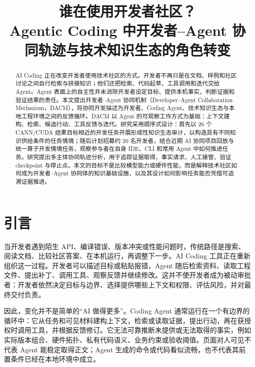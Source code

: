 \documentclass[manuscript,review,anonymous]{acmart}
\newcommand{\cn}[1]{#1}
\begin{document}
\title{\cn{谁在使用开发者社区？}\\Agentic Coding \cn{中开发者--Agent 协同轨迹与技术知识生态的角色转变}}

\begin{abstract}
AI Coding 正在改变开发者使用技术社区的方式。开发者不再只是在文档、样例和社区讨论之间自行检索与拼接知识；他们还把检索、代码起草、工具调用和迭代交给 Agent。Agent 表面上的自主性并未消除开发者设定目标、提供本机事实、判断证据和验证结果的责任。本文提出开发者--Agent 协同机制（Developer--Agent Collaboration Mechanism，DACM），将协同开发描述为开发者、Coding Agent、技术知识生态与本地工程环境之间的反馈循环。DACM 以 Agent 的可观察工作方式为基础：上下文建构、检索、候选行动、工具反馈与迭代。研究采用顺序式设计：首先以 26 个 CANN/CUDA 结果目标相近的开发任务开展形成性知识生态审计，以构造具有不同知识供给条件的任务情境；随后计划招募约 20 名开发者，结合近期 AI 协同项目回放与统一算子开发情境任务，观察参与者在自身 IDE、CLI 和常用 Agent 中如何推进任务。研究提出多主体协同轨迹分析，用于追踪证据取得、事实请求、人工接管、验证 checkpoint 与停止点。本文的目标不是比较模型能力或硬件性能，而是解释技术社区如何成为开发者--Agent 协同体的知识基础设施，以及其设计如何影响任务能否凭借可追溯证据推进。
\end{abstract}

\maketitle

\section{引言}

当开发者遇到陌生 API、编译错误、版本冲突或性能问题时，传统路径是搜索、阅读文档、比较社区答案、在本机运行，再调整下一步。AI Coding 工具正在重新组织这一过程。开发者可以描述目标或粘贴报错，Agent 随后检索资料、读取工程文件、提出补丁、调用工具、观察反馈并继续修改。这并不使开发者成为被动审批者：开发者依然决定目标与边界、选择提供哪些上下文和权限、评估风险，并对最终交付负责。

因此，变化并不是简单的“AI 做得更多”。Coding Agent 通常运行在一个有边界的循环中：它从任务和可见材料建构上下文，检索或读取证据，提出行动，再在获授权时调用工具，并根据反馈修订。它无法可靠推断未提供或无法取得的事实，例如实际版本组合、硬件拓扑、私有代码语义、业务约束或验收阈值。页面对人可见不代表 Agent 能稳定取得正文；Agent 生成的命令或代码看似流畅，也不代表其前置条件已经在本地环境中成立。
\end{document}
